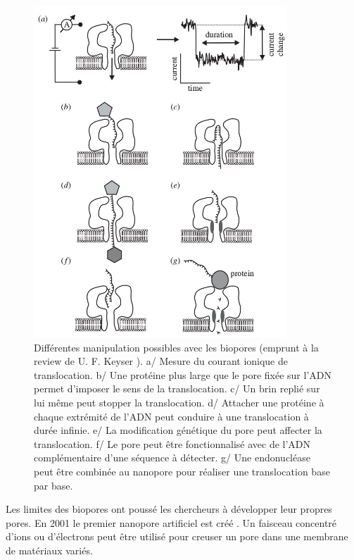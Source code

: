 \documentclass[a4paper,11pt]{article}
\begin{document}
\begin{figure}[h!]
\begin{center}
\includegraphics[width=0.85\textwidth]{bionanopore.jpg}


\caption{Différentes manipulation possibles avec les biopores (emprunt à la review de U. F. Keyser \cite{keyser}). a/ Mesure du courant ionique de translocation. b/ Une protéine plus large que le pore fixée sur l'ADN permet d'imposer le sens de la translocation. c/ Un brin replié sur lui même peut stopper la translocation. d/ Attacher une protéine à chaque extrémité de l'ADN peut conduire à une translocation à durée infinie. e/ La modification génétique du pore peut affecter la translocation. f/ Le pore peut être fonctionnalisé avec de l'ADN complémentaire d'une séquence à détecter. g/ Une endonucléase peut être combinée au nanopore pour réaliser une translocation base par base.}
\label{bioporepossib}
\end{center}
\end{figure}



Les limites des biopores ont poussé les chercheurs à développer leur propres pores. En 2001 le premier nanopore artificiel est créé \cite{Li2001}. Un faisceau concentré d'ions ou d'électrons peut être utilisé pour creuser un pore dans une membrane de matériaux variés\cite{Wanunu2010}.
\end{document}
